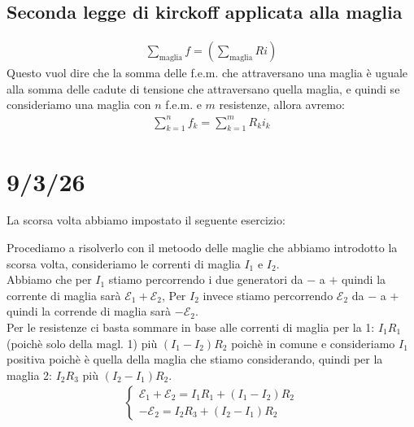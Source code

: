 \documentclass[a4paper, oneside]{article}
\newcommand{\E}{\mathcal{E}}
\begin{document}
\subsection{Seconda legge di kirckoff applicata alla maglia}
\begin{gather*}
    \sum_\text{maglia} f = (\sum_\text{maglia} R i)
\end{gather*}
Questo vuol dire che la somma delle f.e.m. che attraversano una maglia è uguale alla somma delle cadute di tensione che attraversano quella maglia, e quindi se consideriamo una maglia con $n$ f.e.m. e $m$ resistenze, allora avremo:
\begin{gather*}
    \sum_{k=1}^{n} f_k = \sum_{k=1}^{m} R_k i_k
\end{gather*}
\newpage
\section{9/3/26}
La scorsa volta abbiamo impostato il seguente esercizio:
\begin{center}
\end{center}
Procediamo a risolverlo con il metoodo delle maglie che abbiamo introdotto la scorsa volta, consideriamo le correnti di maglia $I_1$ e $I_2$.\\
Abbiamo che per $I_1$ stiamo percorrendo i due generatori da $-$ a $+$ quindi la corrente di maglia sarà $\E_1 + \E_2$, Per $I_2$ invece stiamo percorrendo $\E_2$ da $-$ a $+$ quindi la corrende di maglia sarà $-\E_2$.\\
Per le resistenze ci basta sommare in base alle correnti di maglia per la 1: $I_1 R_1$ (poichè solo della magl. 1) più $(I_1-I_2) R_2$ poichè in comune e consideriamo $I_1$ positiva poichè è quella della maglia che stiamo considerando, quindi per la maglia 2: $I_2 R_3$ più $(I_2 -I_1) R_2$.
\begin{gather*}
    \begin{cases}
        \mathcal{E}_1 + \mathcal{E}_2 = I_1 R_1 + (I_1 - I_2) R_2\\
        -\mathcal{E}_2 = I_2 R_3 + (I_2 - I_1) R_2
    \end{cases}
\end{gather*}
\end{document}
